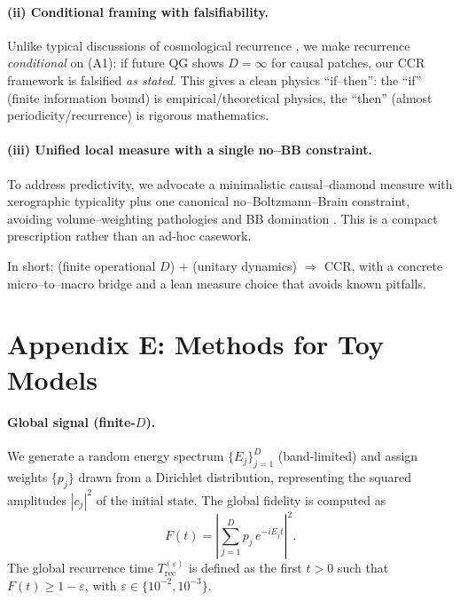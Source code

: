 \documentclass[12pt]{article}
\newcommand{\Trec}{T_{\mathrm{rec}}}
\theoremstyle{remark}
\begin{document}
\paragraph{(ii) Conditional framing with falsifiability.}
Unlike typical discussions of cosmological recurrence \cite{DysonKlebanSusskind2002}, we make recurrence \emph{conditional} on (A1): if future QG shows $D=\infty$ for causal patches, our CCR framework is falsified \emph{as stated}. 
This gives a clean physics “if–then”: the “if” (finite information bound) is empirical/theoretical physics, the “then” (almost periodicity/recurrence) is rigorous mathematics.

\paragraph{(iii) Unified local measure with a single no–BB constraint.}
To address predictivity, we advocate a minimalistic causal–diamond measure with xerographic typicality plus one canonical no–Boltzmann–Brain constraint, avoiding volume–weighting pathologies and BB domination \cite{DysonKlebanSusskind2002,Page2007}.
This is a compact prescription rather than an ad-hoc casework.

\noindent In short: (finite operational $D$) $+$ (unitary dynamics) $\Rightarrow$ CCR, with a concrete micro–to–macro bridge and a lean measure choice that avoids known pitfalls.





\nocite{*}

\section*{Appendix E: Methods for Toy Models}
\label{app:methods-toys}

\paragraph{Global signal (finite-$D$).}
We generate a random energy spectrum $\{E_j\}_{j=1}^D$ (band-limited) and assign weights $\{p_j\}$ drawn from a Dirichlet distribution, representing the squared amplitudes $|c_j|^2$ of the initial state.
The global fidelity is computed as
\[
F(t) = \left| \sum_{j=1}^D p_j \, e^{-i E_j t} \right|^2 .
\]
The global recurrence time $\Trec^{(\varepsilon)}$ is defined as the first $t>0$ such that $F(t) \geq 1-\varepsilon$, with $\varepsilon \in \{10^{-2}, 10^{-3}\}$.
\end{document}
